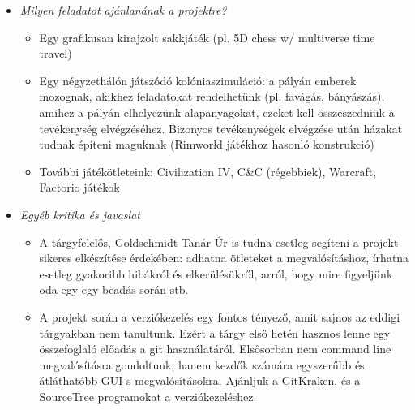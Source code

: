 \documentclass[../../projlab]{subfiles}
\begin{document}
\begin{itemize}
\item \textit{Milyen feladatot ajánlanának a projektre?} \newline
    
    \begin{itemize}
        \item Egy grafikusan kirajzolt sakkjáték (pl. 5D chess w/ multiverse time travel)
        \item Egy négyzethálón játszódó kolóniaszimuláció: a pályán emberek mozognak, akikhez feladatokat rendelhetünk (pl. favágás, bányászás), amihez a pályán elhelyezünk alapanyagokat, ezeket kell összeszedniük a tevékenység elvégzéséhez. Bizonyos tevékenységek elvégzése után házakat tudnak építeni maguknak (Rimworld játékhoz hasonló konstrukció) 
        \item További játékötleteink: Civilization IV, C\&C (régebbiek), Warcraft, Factorio játékok 
    \end{itemize}

\item \textit{Egyéb kritika és javaslat} \newline

    \begin{itemize}
        \item A tárgyfelelős, Goldschmidt Tanár Úr is tudna esetleg segíteni a projekt sikeres elkészítése érdekében: adhatna ötleteket a megvalósításhoz, írhatna esetleg gyakoribb hibákról és elkerülésükről, arról, hogy mire figyeljünk oda egy-egy beadás során stb.
        \item A projekt során a verziókezelés egy fontos tényező, amit sajnos az eddigi tárgyakban nem tanultunk. Ezért a tárgy első hetén hasznos lenne egy összefoglaló előadás a git használatáról. Elsősorban nem command line megvalósításra gondoltunk, hanem kezdők számára egyszerűbb és átláthatóbb GUI-s megvalósításokra. Ajánljuk a GitKraken, és a SourceTree programokat a verziókezeléshez.
    \end{itemize}
     
\end{itemize}
\end{document}
